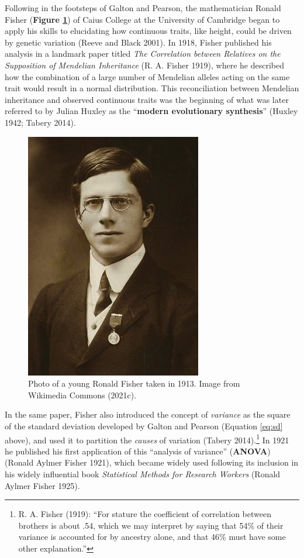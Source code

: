\documentclass[
]{book}
\begin{document}
Following in the footsteps of Galton and Pearson, the mathematician Ronald Fisher (\textbf{Figure \ref{fig:fisher}}) of Caius College at the University of Cambridge began to apply his skills to elucidating how continuous traits, like height, could be driven by genetic variation (Reeve and Black 2001). In 1918, Fisher published his analysis in a landmark paper titled \emph{The Correlation between Relatives on the Supposition of Mendelian Inheritance} (R. A. Fisher 1919), where he described how the combination of a large number of Mendelian alleles acting on the same trait would result in a normal distribution. This reconciliation between Mendelian inheritance and observed continuous traits was the beginning of what was later referred to by Julian Huxley as the ``\textbf{modern evolutionary synthesis}'' (Huxley 1942; Tabery 2014).



\begin{figure}

{\centering \includegraphics[width=0.6\linewidth]{figs/introduction/Youngronaldfisher2} 

}

\caption{Photo of a young Ronald Fisher taken in 1913. Image from Wikimedia Commons (2021c).}\label{fig:fisher}
\end{figure}

In the same paper, Fisher also introduced the concept of \emph{variance} as the square of the standard deviation developed by Galton and Pearson (Equation \eqref{eq:sd} above), and used it to partition the \emph{causes} of variation (Tabery 2014).\footnote{R. A. Fisher (1919): ``For stature the coefficient of correlation between brothers is about .54, which we may interpret by saying that 54\% of their variance is accounted for by ancestry alone, and that 46\% must have some other explanation.''} In 1921 he published his first application of this ``analysis of variance'' (\textbf{ANOVA}) (Ronald Aylmer Fisher 1921), which became widely used following its inclusion in his widely influential book \emph{Statistical Methods for Research Workers} (Ronald Aylmer Fisher 1925).
\end{document}
